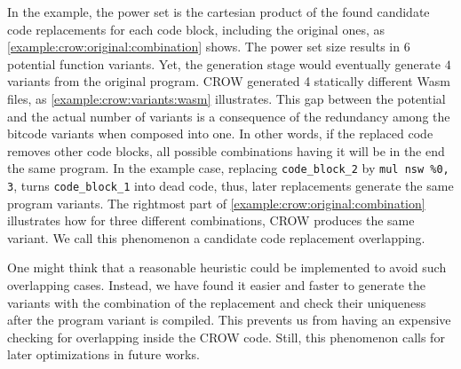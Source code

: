 In the example, the power set is the cartesian product of the found candidate code replacements for each code block, including the original ones, as \autoref{example:crow:original:combination} shows. The power set size results in $6$ potential function variants. Yet, the generation stage would eventually generate $4$ variants from the original program. CROW generated 4 statically different Wasm files, as \autoref{example:crow:variants:wasm} illustrates. This gap between the potential and the actual number of variants is a consequence of the redundancy among the bitcode variants when composed into one. In other words, if the replaced code removes other code blocks, all possible combinations having it will be in the end the same program. In the example case, replacing \texttt{code\_block\_2} by \texttt{mul nsw \%0, 3}, turns \texttt{code\_block\_1} into dead code, thus, later replacements generate the same program variants. The rightmost part of \autoref{example:crow:original:combination} illustrates how for three different combinations, CROW produces the same variant. We call this phenomenon a candidate code replacement overlapping.

One might think that a reasonable heuristic could be implemented to avoid such overlapping cases. Instead, we have found it easier and faster to generate the variants with the combination of the replacement and check their uniqueness after the program variant is compiled. This prevents us from having an expensive checking for overlapping inside the CROW code. Still, this phenomenon calls for later optimizations in future works.


